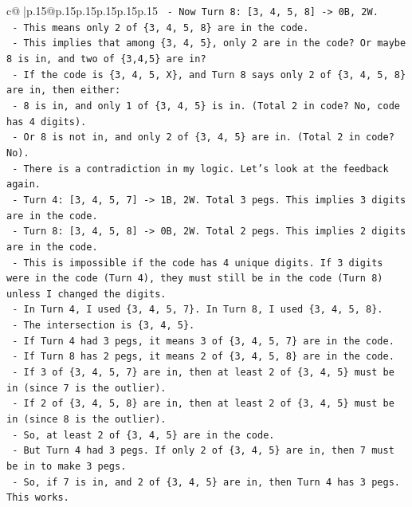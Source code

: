 \documentclass{article}
\begin{document}
{\begin{supertabular}{c@{$\;$}|p{.15\linewidth}@{}p{.15\linewidth}p{.15\linewidth}p{.15\linewidth}p{.15\linewidth}p{.15\linewidth}}
{{{\texttt{  {-} Now Turn 8: {[}3, 4, 5, 8{]} {-}> 0B, 2W.} \\
\texttt{    {-} This means only 2 of \{3, 4, 5, 8\} are in the code.} \\
\texttt{    {-} This implies that among \{3, 4, 5\}, only 2 are in the code? Or maybe 8 is in, and two of \{3,4,5\} are in?} \\
\texttt{    {-} If the code is \{3, 4, 5, X\}, and Turn 8 says only 2 of \{3, 4, 5, 8\} are in, then either:} \\
\texttt{      {-} 8 is in, and only 1 of \{3, 4, 5\} is in. (Total 2 in code? No, code has 4 digits).} \\
\texttt{      {-} Or 8 is not in, and only 2 of \{3, 4, 5\} are in. (Total 2 in code? No).} \\
\texttt{    {-} There is a contradiction in my logic. Let's look at the feedback again.} \\
\texttt{    {-} Turn 4: {[}3, 4, 5, 7{]} {-}> 1B, 2W. Total 3 pegs. This implies 3 digits are in the code.} \\
\texttt{    {-} Turn 8: {[}3, 4, 5, 8{]} {-}> 0B, 2W. Total 2 pegs. This implies 2 digits are in the code.} \\
\texttt{    {-} This is impossible if the code has 4 unique digits. If 3 digits were in the code (Turn 4), they must still be in the code (Turn 8) unless I changed the digits.} \\
\texttt{    {-} In Turn 4, I used \{3, 4, 5, 7\}. In Turn 8, I used \{3, 4, 5, 8\}.} \\
\texttt{    {-} The intersection is \{3, 4, 5\}.} \\
\texttt{    {-} If Turn 4 had 3 pegs, it means 3 of \{3, 4, 5, 7\} are in the code.} \\
\texttt{    {-} If Turn 8 has 2 pegs, it means 2 of \{3, 4, 5, 8\} are in the code.} \\
\texttt{    {-} If 3 of \{3, 4, 5, 7\} are in, then at least 2 of \{3, 4, 5\} must be in (since 7 is the outlier).} \\
\texttt{    {-} If 2 of \{3, 4, 5, 8\} are in, then at least 2 of \{3, 4, 5\} must be in (since 8 is the outlier).} \\
\texttt{    {-} So, at least 2 of \{3, 4, 5\} are in the code.} \\
\texttt{    {-} But Turn 4 had 3 pegs. If only 2 of \{3, 4, 5\} are in, then 7 must be in to make 3 pegs.} \\
\texttt{    {-} So, if 7 is in, and 2 of \{3, 4, 5\} are in, then Turn 4 has 3 pegs. This works.} \\
}}}
\end{supertabular}}
\end{document}
